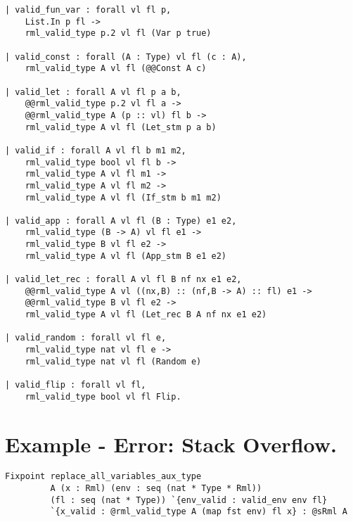 \documentclass[11pt, leqno, titlepage]{article}
\theoremstyle{definition}
\begin{document}
\begin{appendices}
\begin{lstlisting}[language=coq]
| valid_fun_var : forall vl fl p,
    List.In p fl ->
    rml_valid_type p.2 vl fl (Var p true)
                   
| valid_const : forall (A : Type) vl fl (c : A),
    rml_valid_type A vl fl (@@Const A c)
                   
| valid_let : forall A vl fl p a b,
    @@rml_valid_type p.2 vl fl a ->
    @@rml_valid_type A (p :: vl) fl b ->
    rml_valid_type A vl fl (Let_stm p a b)
                   
| valid_if : forall A vl fl b m1 m2,
    rml_valid_type bool vl fl b ->
    rml_valid_type A vl fl m1 ->
    rml_valid_type A vl fl m2 ->
    rml_valid_type A vl fl (If_stm b m1 m2)
                   
| valid_app : forall A vl fl (B : Type) e1 e2,
    rml_valid_type (B -> A) vl fl e1 ->
    rml_valid_type B vl fl e2 ->
    rml_valid_type A vl fl (App_stm B e1 e2)

| valid_let_rec : forall A vl fl B nf nx e1 e2,
    @@rml_valid_type A vl ((nx,B) :: (nf,B -> A) :: fl) e1 ->
    @@rml_valid_type B vl fl e2 ->
    rml_valid_type A vl fl (Let_rec B A nf nx e1 e2)

| valid_random : forall vl fl e,
    rml_valid_type nat vl fl e ->
    rml_valid_type nat vl fl (Random e)

| valid_flip : forall vl fl,
    rml_valid_type bool vl fl Flip.
\end{lstlisting}
  \newpage

  \section{Example - Error: Stack Overflow.}
\begin{lstlisting}[language=coq]
Fixpoint replace_all_variables_aux_type
         A (x : Rml) (env : seq (nat * Type * Rml))
         (fl : seq (nat * Type)) `{env_valid : valid_env env fl}
         `{x_valid : @rml_valid_type A (map fst env) fl x} : @sRml A
                                                                            

\end{lstlisting}
\end{appendices}
\end{document}
